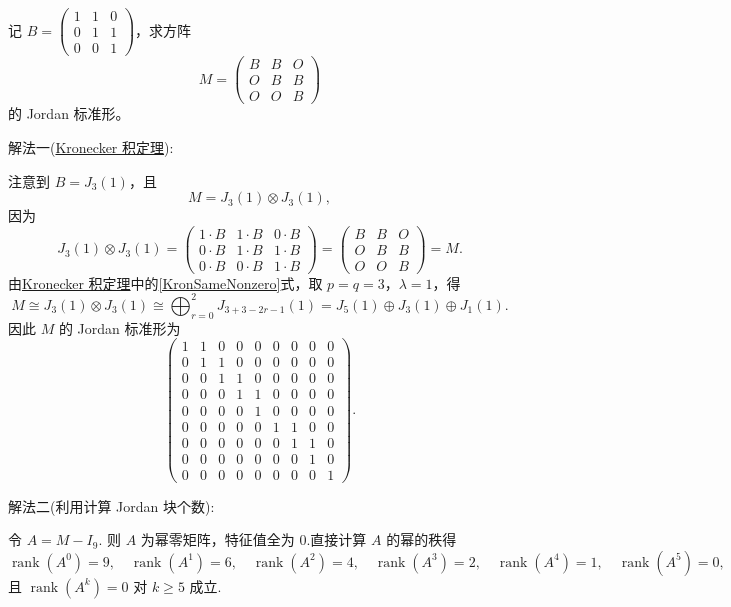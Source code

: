 \documentclass[../../main.tex]{subfiles}%
\begin{document}
\begin{example}
记 $B=\begin{pmatrix}1&1&0\\0&1&1\\0&0&1\end{pmatrix}$，求方阵
\[
M=\begin{pmatrix}B&B&O\\O&B&B\\O&O&B\end{pmatrix}
\]
的 Jordan 标准形。
\end{example}
\begin{solution}

{\color{blue}解法一(\hyperref[theorem:Kronecker积定理]{Kronecker 积定理}):}

注意到 $B=J_3(1)$，且
\[
M=J_3(1)\otimes J_3(1),
\]
因为
\[
J_3(1)\otimes J_3(1)=
\begin{pmatrix}
1\cdot B & 1\cdot B & 0\cdot B\\
0\cdot B & 1\cdot B & 1\cdot B\\
0\cdot B & 0\cdot B & 1\cdot B
\end{pmatrix}
=
\begin{pmatrix}
B&B&O\\
O&B&B\\
O&O&B
\end{pmatrix}=M.
\]
由\hyperref[theorem:Kronecker积定理]{Kronecker 积定理}中的\eqref{KronSameNonzero}式，取 $p=q=3$，$\lambda=1$，得
\[
M\cong J_3(1)\otimes J_3(1)\cong \bigoplus_{r=0}^{2} J_{3+3-2r-1}(1)
=J_5(1)\oplus J_3(1)\oplus J_1(1).
\]
因此 $M$ 的 Jordan 标准形为
\[
\begin{pmatrix}
1&1&0&0&0&0&0&0&0\\
0&1&1&0&0&0&0&0&0\\
0&0&1&1&0&0&0&0&0\\
0&0&0&1&1&0&0&0&0\\
0&0&0&0&1&0&0&0&0\\
0&0&0&0&0&1&1&0&0\\
0&0&0&0&0&0&1&1&0\\
0&0&0&0&0&0&0&1&0\\
0&0&0&0&0&0&0&0&1
\end{pmatrix}.
\]

{\color{blue}解法二(利用计算 Jordan 块个数):}

令 $A=M-I_9$. 则 $A$ 为幂零矩阵，特征值全为 $0$.直接计算 $A$ 的幂的秩得
\[
\operatorname{rank}(A^0)=9,\quad
\operatorname{rank}(A^1)=6,\quad
\operatorname{rank}(A^2)=4,\quad
\operatorname{rank}(A^3)=2,\quad
\operatorname{rank}(A^4)=1,\quad
\operatorname{rank}(A^5)=0,
\]
且 $\operatorname{rank}(A^k)=0$ 对 $k\geqslant 5$ 成立.


\end{solution}
\end{document}

